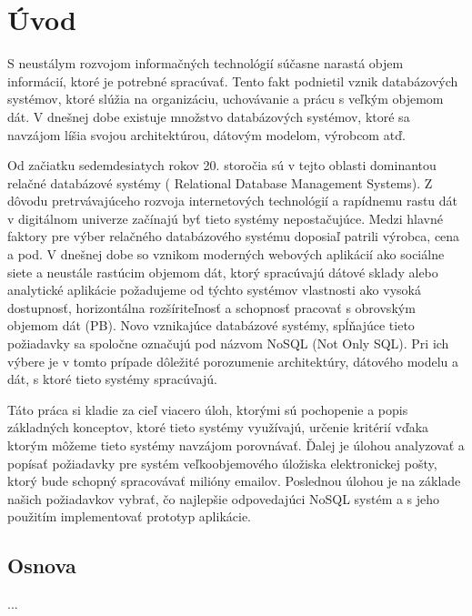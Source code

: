 \documentclass[11pt,twoside,a4paper]{book}
\begin{document}
\chapter{Úvod}
S neustálym rozvojom informačných technológií súčasne narastá objem informácií, ktoré je potrebné spracúvať. Tento fakt podnietil vznik databázových systémov, ktoré slúžia na organizáciu, uchovávanie a prácu s veľkým objemom dát. V dnešnej dobe existuje množstvo databázových systémov, ktoré sa navzájom líšia svojou architektúrou, dátovým modelom, výrobcom atď.

Od začiatku sedemdesiatych rokov 20. storočia sú v tejto oblasti dominantou relačné databázové systémy (  Relational Database Management Systems). Z dôvodu pretrvávajúceho rozvoja internetových technológií a rapídnemu rastu dát v digitálnom univerze \cite{Gantz_Mcarthur_Minton_2007} začínajú byť tieto systémy nepostačujúce. Medzi hlavné faktory pre výber relačného databázového systému doposiaľ patrili výrobca, cena a pod. V dnešnej dobe so vznikom moderných webových aplikácií ako sociálne siete a neustále rastúcim objemom dát, ktorý spracúvajú dátové sklady alebo analytické aplikácie požadujeme od týchto systémov vlastnosti ako vysoká dostupnosť, horizontálna rozšíriteľnosť a schopnosť pracovať s obrovským objemom dát (PB). Novo vznikajúce databázové systémy, spĺňajúce tieto požiadavky sa spoločne označujú pod názvom NoSQL (Not Only SQL). Pri ich výbere je v tomto prípade dôležité porozumenie architektúry, dátového modelu a dát, s ktoré tieto systémy spracúvajú.

Táto práca si kladie za cieľ viacero úloh, ktorými sú pochopenie a popis základných  konceptov, ktoré tieto systémy využívajú, určenie kritérií vďaka ktorým môžeme tieto systémy navzájom porovnávať. Ďalej je úlohou analyzovať a popísať požiadavky pre systém veľkoobjemového úložiska elektronickej pošty, ktorý bude schopný spracovávať milióny emailov. Poslednou úlohou je na základe našich požiadavkov vybrať, čo najlepšie odpovedajúci NoSQL systém a s jeho použitím implementovať prototyp aplikácie.


\section*{Osnova}
...
\end{document}
